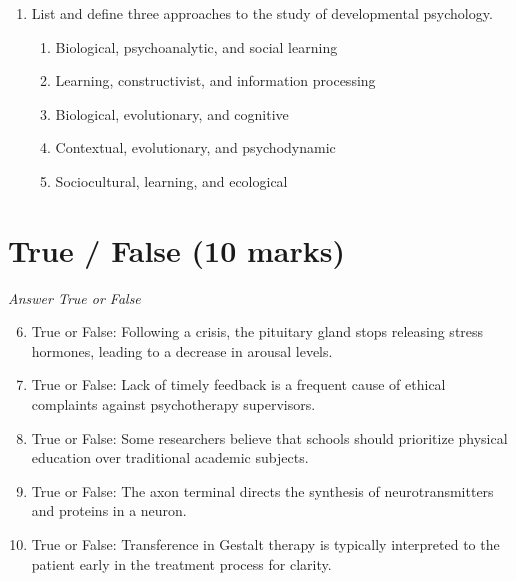\documentclass[12pt]{article}
\begin{document}
\begin{enumerate}[label=\arabic*.]
\begin{enumerate}[label=(\alph*)]
    \item fixation
    \item projection
    \item symptom
    \item regression
    \item denial
\end{enumerate}
\item List and define three approaches to the study of developmental psychology.
\begin{enumerate}[label=(\alph*)]
    \item Biological, psychoanalytic, and social learning
    \item Learning, constructivist, and information processing
    \item Biological, evolutionary, and cognitive
    \item Contextual, evolutionary, and psychodynamic
    \item Sociocultural, learning, and ecological
\end{enumerate}
\end{enumerate}

\section*{True / False (10 marks)}
\textit{Answer True or False}
\begin{enumerate}[label=\arabic*.]
\setcounter{enumi}{5}
\item True or False: Following a crisis, the pituitary gland stops releasing stress hormones, leading to a decrease in arousal levels.
\item True or False: Lack of timely feedback is a frequent cause of ethical complaints against psychotherapy supervisors.
\item True or False: Some researchers believe that schools should prioritize physical education over traditional academic subjects.
\item True or False: The axon terminal directs the synthesis of neurotransmitters and proteins in a neuron.
\item True or False: Transference in Gestalt therapy is typically interpreted to the patient early in the treatment process for clarity.
\end{enumerate}
\end{document}
